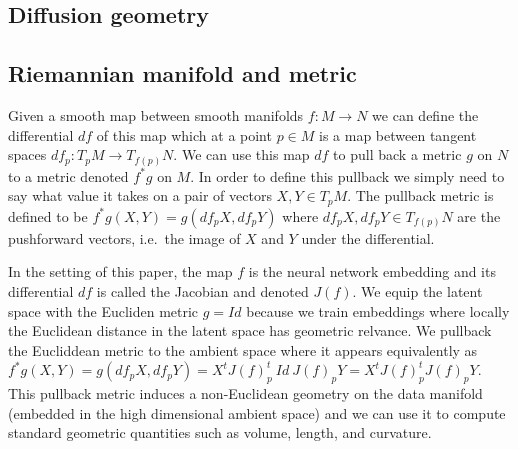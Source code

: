 \documentclass{article}
\theoremstyle{plain}
\theoremstyle{definition}
\theoremstyle{remark}
\begin{document}
\subsection{Diffusion geometry}

\subsection{Riemannian manifold and metric} 


Given a smooth map between smooth manifolds $f \colon M \to N$ we can define the differential $df$ of this map which at a point $p\in M$ is a map between tangent spaces $df_p \colon T_pM \to T_{f(p)} N$. We can use this map $df$ to pull back a metric $g$ on $N$ to a metric denoted $f^*g$ on $M$. In order to define this pullback we simply need to say what value it takes on a pair of vectors $X,Y \in T_pM$. The pullback metric is defined to be $f^*g(X,Y)= g(df_pX,df_pY )$ where $df_pX,df_pY  \in T_{f(p)} N$ are the pushforward vectors, i.e.~the image of $X$ and $Y$ under the differential. 


In the setting of this paper, the map $f$ is the neural network embedding and its differential $df$ is called the Jacobian and denoted $J(f)$. We equip the latent space with the Eucliden metric $g=Id$ because we train embeddings where locally the Euclidean distance in the latent space has geometric relvance. We pullback the Eucliddean metric to the ambient space where it appears equivalently as $f^*g(X,Y)= g(df_pX,df_pY )= X^t J(f)^t_p ~Id~ J(f)_p Y = X^t J(f)^t_p J(f)_p Y$. This pullback metric induces a non-Euclidean geometry on the data manifold (embedded in the high dimensional ambient space) and we can use it to compute standard geometric quantities such as volume, length, and curvature. 
\end{document}

